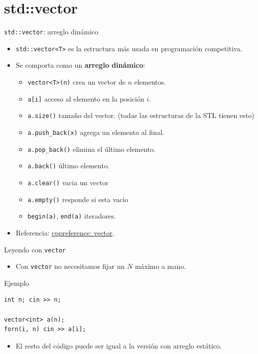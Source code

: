 \documentclass[aspectratio=169]{beamer}
\begin{document}
\section{std::vector}

\begin{frame}{\texttt{std::vector}: arreglo dinámico}
  \begin{itemize}
    \item \texttt{std::vector<T>} es la estructura más usada en programación competitiva.
    \item Se comporta como un \textbf{arreglo dinámico}:
      \begin{itemize}
        \item \texttt{vector<T>(n)} crea un vector de \(n\) elementos.
        \item \texttt{a[i]} acceso al elemento en la posición \(i\).
        \item \texttt{a.size()} tamaño del vector. (todas las estructuras de la STL tienen esto)
        \item \texttt{a.push\_back(x)} agrega un elemento al final.
        \item \texttt{a.pop\_back()} elimina el último elemento.
        \item \texttt{a.back()} último elemento.
        \item \texttt{a.clear()} vacia un vector
        \item \texttt{a.empty()} responde si esta vacio
        \item \texttt{begin(a)}, \texttt{end(a)} iteradores.
      \end{itemize}
    \item Referencia: \href{https://en.cppreference.com/w/cpp/container/vector}{cppreference: vector}.
  \end{itemize}
\end{frame}

\begin{frame}[fragile]{Leyendo con \texttt{vector}}
  \begin{itemize}
    \item Con \texttt{vector} no necesitamos fijar un \(N\) máximo a mano.
  \end{itemize}
  \begin{block}{Ejemplo}
  \begin{lstlisting}[style=customc]
int n; cin >> n;

vector<int> a(n);
forn(i, n) cin >> a[i];\end{lstlisting}
  \end{block}
  \begin{itemize}
    \item El resto del código puede ser igual a la versión con arreglo estático.
  \end{itemize}
\end{frame}
\end{document}
